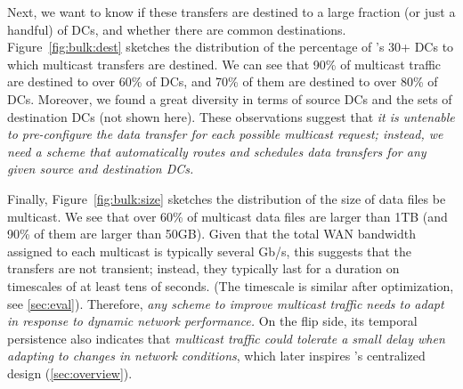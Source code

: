 \vspace{0.1cm}
Next, we want to know if these transfers are destined to
a large fraction (or just a handful) of DCs, and whether 
there are common destinations.
Figure~\ref{fig:bulk:dest} sketches the distribution of the
percentage of \company's 30+ DCs to which multicast
transfers are destined.
We can see that 90\% of multicast traffic are destined
to over 60\% of DCs, and 70\% of them are destined
to over 80\% of DCs.
Moreover, we found a great diversity in terms of
source DCs and the sets of destination DCs (not shown here).
These observations suggest that {\em it is untenable
to pre-configure the data transfer for each possible multicast
request; instead, we need a scheme that automatically routes and 
schedules data transfers for any given source and destination
DCs.}


Finally, Figure~\ref{fig:bulk:size} sketches the distribution of 
the size of data files be multicast.
We see that over 60\% of multicast data files are larger than 1TB
(and 90\% of them are larger than 50GB).
Given that the total WAN bandwidth assigned to each multicast
is typically several Gb/s, 
this suggests that the transfers are not transient; instead, they
typically last for a duration on timescales of at least tens of 
seconds. (The timescale is similar after optimization, see \Section\ref{sec:eval}). 
Therefore, {\em any scheme to improve multicast traffic needs to
adapt in response to dynamic network performance.}
On the flip side, its temporal persistence
also indicates that {\em multicast traffic could tolerate a small 
delay 
when adapting to changes in network conditions}, which later 
inspires 
\name's centralized design (\Section\ref{sec:overview}).


